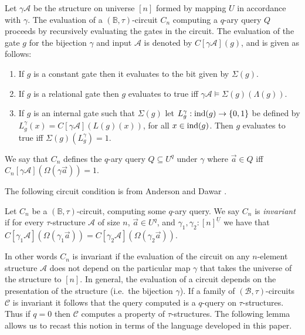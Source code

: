 \documentclass[../paper.tex]{subfiles}
\begin{document}
Let $\gamma \mathcal{A}$ be the structure on universe $[n]$ formed by mapping
$U$ in accordance with $\gamma$. The evaluation of a $(\mathbb{B},
\tau)$-circuit $C_n$ computing a $q$-ary query $Q$ proceeds by recursively
evaluating the gates in the circuit. The evaluation of the gate $g$ for the
bijection $\gamma$ and input $\mathcal{A}$ is denoted by $C[\gamma
\mathcal{A}](g)$, and is given as follows:
\begin{enumerate}
  \setlength\itemsep{0mm}
\item If $g$ is a constant gate then it evaluates to the bit given by
  $\Sigma(g)$.
\item If $g$ is a relational gate then $g$ evaluates to true iff $\gamma
  \mathcal{A} \models \Sigma(g)(\Lambda (g))$.
\item If $g$ is an internal gate such that $\Sigma (g)$ let $L^{\gamma}_g:
  \text{\upshape ind}(g) \rightarrow \{0,1\}$ be defined by $L^{\gamma}_g(x) = C[\gamma
  \mathcal{A}](L(g)(x))$, for all $x \in \text{\upshape ind}(g)$. Then $g$ evaluates to true
  iff $\Sigma(g) (L^{\gamma}_g) = 1$.
\end{enumerate}
We say that $C_n$ defines the $q$-ary query $Q \subseteq U^q$ under $\gamma$
where $\vec{a} \in Q$ iff $C_n[\gamma \mathcal{A}](\Omega (\gamma \vec{a})) =
1$.


The following circuit condition is from Anderson and Dawar \cite{AndersonD17}.

\begin{definition}
  Let $C_n$ be a $(\mathbb{B}, \tau)$-circuit, computing some $q$-ary query. We
  say $C_n$ is \emph{invariant} if for every $\tau$-structure $\mathcal{A}$ of
  size $n$, $\vec{a} \in U^{q}$, and $\gamma_1, \gamma_2: [n]^{\underline{U}}$
  we have that $C[\gamma_1 \mathcal{A}](\Omega (\gamma_1 \vec{a})) = C[\gamma_2
  \mathcal{A}](\Omega (\gamma_2 \vec{a}))$.
\end{definition}

In other words $C_n$ is invariant if the evaluation of the circuit on any
$n$-element structure $\mathcal{A}$ does not depend on the particular map
$\gamma$ that takes the universe of the structure to $[n]$. In general, the
evaluation of a circuit depends on the presentation of the structure (i.e.\ the
bijection $\gamma$). If a family of $(\mathcal{B}, \tau)$-circuits $\mathcal{C}$
is invariant it follows that the query computed is a $q$-query on
$\tau$-structures. Thus if $q = 0$ then $\mathcal{C}$ computes a property of
$\tau$-structures. The following lemma allows us to recast this notion in terms
of the language developed in this paper.
\end{document}
